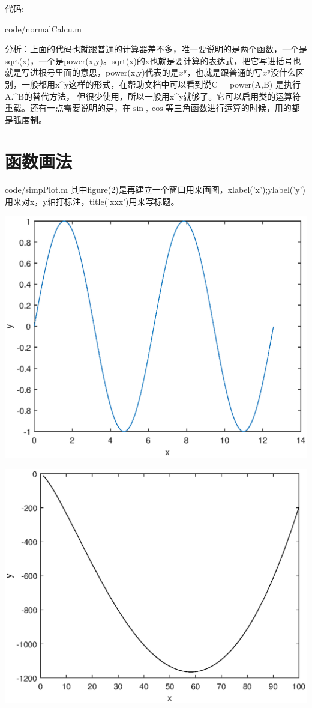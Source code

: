\documentclass{hfutpaper}
\makeatletter
\newcommand{\figcaption}{\def\@captype{figure}\caption}
\makeatother
\begin{document}
代码:

{code/normalCalcu.m}

分析：上面的代码也就跟普通的计算器差不多，唯一要说明的是两个函数，一个是sqrt(x)，一个是power(x,y)。sqrt(x)的x也就是要计算的表达式，把它写进括号也就是写进根号里面的意思，power(x,y)代表的是$x^y$，也就是跟普通的写$x^y$没什么区别，一般都用x\^{}y这样的形式，在帮助文档中可以看到说C = power(A,B) 是执行 A.\^{}B的替代方法， 但很少使用，所以一般用x\^{}y就够了。它可以启用类的运算符重载。还有一点需要说明的是，在$\sin,\cos$等三角函数进行运算的时候，\underline{用的都是弧度制。}
\section*{函数画法}

{code/simpPlot.m}
其中figure(2)是再建立一个窗口用来画图，xlabel('x');ylabel('y')用来对x，y轴打标注，title('xxx')用来写标题。

\includegraphics{figure/plot1.eps}
\figcaption{$y=sin(x)$}
\includegraphics{figure/plot2.eps}
\figcaption{$y=x^2-2x+\sqrt{x}-x^{\frac{1}{3}}-10x^{1.5}$}
\end{document}
